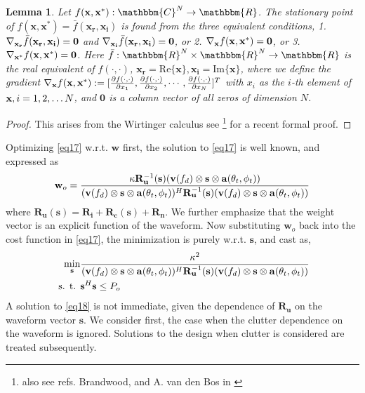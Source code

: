 \documentclass[11pt,draftclsnofoot,onecolumn]{IEEEtran}
\newtheorem{lem}{\bf {Lemma}}
\theoremstyle{definition}
\theoremstyle{remark}
\begin{document}
\begin{lem}\label{crlemma}
Let $f(\mathbf{x},\mathbf{x}^{\ast}):\mathbbm{C}^N\rightarrow\mathbbm{R}$. The stationary point of $f(\mathbf{x},\mathbf{x}^{\ast})=\bar{f}(\mathbf{x_r},\mathbf{x_i})$ is found from the three equivalent conditions, 1.  $\nabla_{\bf x_r}\bar{f}(\mathbf{x_r},\mathbf{x_i})=\mathbf{0}$ and $\nabla_{\bf x_i}\bar{f}(\mathbf{x_r},\mathbf{x_i})=\mathbf{0}$, or 2. $\nabla_{\bf x}f(\mathbf{x},\mathbf{x}^{\ast})=\mathbf{0}$, or 3. $\nabla_{\bf x^{\ast}} f(\mathbf{x},\mathbf{x}^{\ast})=\mathbf{0}$. Here $\bar{f}:\mathbbm{R}^{N}\times\mathbbm{R}^{N}\rightarrow\mathbbm{R}$  is the real equivalent of $f(\cdot,\cdot)$, $\mathbf{x_r}=\mathrm{Re}\{\mathbf{x}\},\mathbf{x_i}=\mathrm{Im}\{\mathbf{x}\}$, where we define the gradient $\nabla_{\bf x} f(\mathbf{x},\mathbf{x}^{\ast}):=[\tfrac{\partial f( \cdot,\cdot)}{\partial x_1},\tfrac{\partial f( \cdot,\cdot)}{\partial x_2},\cdots,\tfrac{\partial f( \cdot,\cdot)}{\partial x_N} ]^T$ with $x_i$ as the $i$-th element of ${\bf x},i=1,2,\ldots N$, and $\mathbf{0}$ is a column vector of all zeros of dimension $N$.
\end{lem}
\begin{proof}
This arises from the Wirtinger calculus see \cite{Gesbert2007} \footnote{ also see refs. Brandwood, and A. van den Bos in \cite{Gesbert2007} } for a recent formal proof.
\end{proof}
Optimizing \eqref{eq17} w.r.t. $\mathbf{w}$ first, the solution to \eqref{eq17} is well known, and expressed as
\begin{equation} \label{weightcomp}
\mathbf{w}_{o}=\frac{\kappa \mathbf{R}_{\bf u}^{-1}(\mathbf{s})(\mathbf{v}(f_d)\otimes\mathbf{s}\otimes\mathbf{a}(\theta_t,\phi_t))}{(\mathbf{v}(f_d)\otimes\mathbf{s}\otimes\mathbf{a}(\theta_t,\phi_t))^H\mathbf{R}_{\bf u}^{-1} (\mathbf{s})(\mathbf{v}(f_d)\otimes\mathbf{s}\otimes\mathbf{a}(\theta_t,\phi_t))}
\end{equation}
where $\mathbf{R_u}(\mathbf{s})=\mathbf{R_i}+\mathbf{R_c}(\mathbf{s})+\mathbf{R_n}$.  We further emphasize that the  weight vector is an explicit function of the waveform.  Now substituting $\mathbf{w}_{o}$ back into the cost function in \eqref{eq17}, the minimization is purely w.r.t. $\mathbf{s}$, and cast as,
\begin{align} \label{eq18}
\min_{\mathbf{s}} &\frac{\kappa^2}{(\mathbf{v}(f_d)\otimes\mathbf{s}\otimes\mathbf{a}(\theta_t,\phi_t))^H\mathbf{R}_{\bf u}^{-1}(\mathbf{s})(\mathbf{v}(f_d)\otimes\mathbf{s}\otimes\mathbf{a}(\theta_t,\phi_t))} \nonumber \\
\mbox{ s. t. } & \mathbf{s}^H \mathbf{s}\leq P_o 
\end{align}
A solution to \eqref{eq18} is not immediate, given the dependence of  $\mathbf{R_u}$ on the waveform vector $\mathbf{s}$. We consider first, the case when the clutter dependence on the waveform is ignored. Solutions to the design when clutter is considered are treated subsequently.
\end{document}
